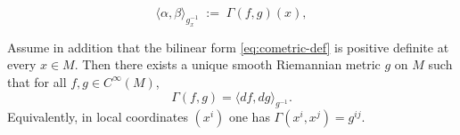 \documentclass[10pt,a4paper]{amsart}
\begin{document}
\begin{equation}\label{eq:cometric-def}
\langle \alpha,\beta\rangle_{g_x^{-1}}
\;:=\;
\Gamma(f,g)(x),
\end{equation}

\begin{theorem}\label{thm:recover-metric-from-Gamma}
Assume in addition that the bilinear form \eqref{eq:cometric-def} is positive definite at every
$x\in M$.  Then there exists a unique smooth Riemannian metric $g$ on $M$ such that for all
$f,g\in C^\infty(M)$,
\begin{equation}\label{eq:Gamma-metric}
\Gamma(f,g)=\langle df,dg\rangle_{g^{-1}}.
\end{equation}
Equivalently, in local coordinates $(x^i)$ one has $\Gamma(x^i,x^j)=g^{ij}$.
\end{theorem}
\end{document}
